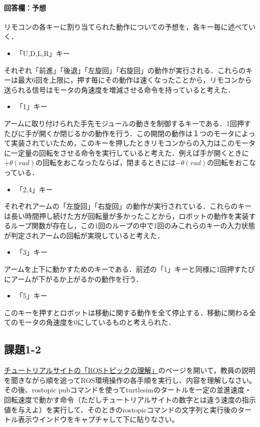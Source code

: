 \documentclass[12pt, xelatex,ja=standard,jafont=hiragino]{bxjsarticle}
\begin{document}
\paragraph{回答欄：予想}
リモコンの各キーに割り当てられた動作についての予想を，各キー毎に述べていく．
\begin{itemize}
    \item 「U,D,L,R」キー
\end{itemize}
それぞれ「前進」「後退」「左旋回」「右旋回」の動作が実行される．これらのキーは最大6回を上限に，押す毎にその動作は速くなったことから，リモコンから送られる信号はモータの角速度を増減させる命令を持っていると考えた．
\begin{itemize}
    \item 「1」キー
\end{itemize}
アームに取り付けられた手先モジュールの動きを制御するキーである．1回押すたびに手が開くか閉じるかの動作を行う．この開閉の動作は１つのモータによって実装されていたため，このキーを押したときリモコンからの入力はこのモータに一定量の回転をさせる命令を実行していると考えた．例えば手が開くときに$+θ(rad)$の回転をおこなったならば，閉まるときには$-θ(rad)$の回転をおこなっている．
\begin{itemize}
    \item 「2,4」キー
\end{itemize}
それぞれアームの「左旋回」「右旋回」の動作が実行されている．これらのキーは長い時間押し続けた方が回転量が多かったことから，ロボットの動作を実装するループ関数が存在し，この1回のループの中で1回のみこれらのキーの入力状態が判定されアームの回転が実現していると考えた．
\begin{itemize}
    \item 「3」キー
\end{itemize}
アームを上下に動かすためのキーである．前述の「1」キーと同様に1回押すたびにアームが下がるか上がるかの動作を行う．


\begin{itemize}
    \item 「5」キー
\end{itemize}
このキーを押すとロボットは移動に関する動作を全て停止する．移動に関わる全てのモータの角速度を$0$にしているものと考えられた．

\subsection{課題1-2}
\begin{screen}
\href{https://wiki.ros.org/ja/ROS/Tutorials/UnderstandingTopics}{チュートリアルサイトの「ROSトピックの理解」}のページを開いて，教員の説明を聞きながら順を追ってROS環境操作の各手順を実行し、内容を理解しなさい。その後、rostopic pubコマンドを使ってturtlesimのタートルを一定の並進速度・回転速度で動かす命令（ただしチュートリアルサイトの数字とは違う速度の指示値を与えよ）を実行して、そのときのrostopicコマンドの文字列と実行後のタートル表示ウインドウをキャプチャして下に貼りなさい。
\end{screen}
\end{document}
